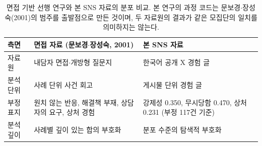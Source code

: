 \begin{table}[h]
  \centering
  \caption{면접 기반 선행 연구와 본 SNS 자료의 분포 비교. 본 연구의 과정 코드는 문보경$\cdot$장성숙(2001)의 범주를 출발점으로 만든 것이며, 두 자료원의 결과가 같은 모집단의 일치를 의미하지는 않는다.}
  \label{tab:compare}
  \small
  \begin{tabularx}{\columnwidth}{@{}>{\raggedright\arraybackslash}p{} >{\raggedright\arraybackslash}X >{\raggedright\arraybackslash}X@{}}
    \toprule
    \textbf{측면} & \textbf{면접 자료 (문보경$\cdot$장성숙, 2001)} & \textbf{본 SNS 자료} \\
    \midrule
    자료원 & 내담자 면접$\cdot$개방형 질문지 & 한국어 공개 X 경험 글 \\
    분석 단위 & 사례 단위 사건 회고 & 게시물 단위 경험 글 \\
    부정 표지 & 원치 않는 반응, 해결책 부재, 상담자의 요구, 상처 경험 & 강제성 0.350, 무시당함 0.470, 상처 0.231 (부정 117건 기준) \\
    분석 깊이 & 사례별 깊이 있는 합의 부호화 & 분포 수준의 탐색적 부호화 \\
    \bottomrule
  \end{tabularx}
\end{table}
